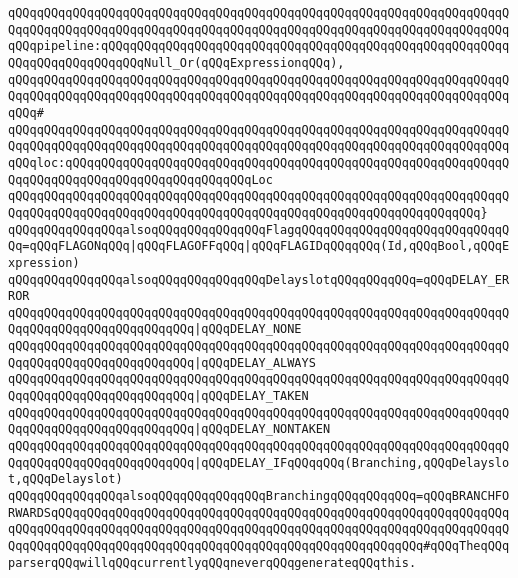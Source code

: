 \verb|qQQqqQQqqQQqqQQqqQQqqQQqqQQqqQQqqQQqqQQqqQQqqQQqqQQqqQQqqQQqqQQqqQQqqQQqqQQqqQQqqQQqqQQqqQQqqQQqqQQqqQQqqQQqqQQqqQQqqQQqqQQqqQQqqQQqqQQqqQQqqQQqpipeline:qQQqqQQqqQQqqQQqqQQqqQQqqQQqqQQqqQQqqQQqqQQqqQQqqQQqqQQqqQQqqQQqqQQqqQQqqQQqNull_Or(qQQqExpressionqQQq),|\newline
\verb|qQQqqQQqqQQqqQQqqQQqqQQqqQQqqQQqqQQqqQQqqQQqqQQqqQQqqQQqqQQqqQQqqQQqqQQqqQQqqQQqqQQqqQQqqQQqqQQqqQQqqQQqqQQqqQQqqQQqqQQqqQQqqQQqqQQqqQQqqQQqqQQq#|\newline
\verb|qQQqqQQqqQQqqQQqqQQqqQQqqQQqqQQqqQQqqQQqqQQqqQQqqQQqqQQqqQQqqQQqqQQqqQQqqQQqqQQqqQQqqQQqqQQqqQQqqQQqqQQqqQQqqQQqqQQqqQQqqQQqqQQqqQQqqQQqqQQqqQQqloc:qQQqqQQqqQQqqQQqqQQqqQQqqQQqqQQqqQQqqQQqqQQqqQQqqQQqqQQqqQQqqQQqqQQqqQQqqQQqqQQqqQQqqQQqqQQqqQQqLoc|\newline
\verb|qQQqqQQqqQQqqQQqqQQqqQQqqQQqqQQqqQQqqQQqqQQqqQQqqQQqqQQqqQQqqQQqqQQqqQQqqQQqqQQqqQQqqQQqqQQqqQQqqQQqqQQqqQQqqQQqqQQqqQQqqQQqqQQqqQQqqQQq}|\newline
\newline
\verb|qQQqqQQqqQQqqQQqalsoqQQqqQQqqQQqqQQqFlagqQQqqQQqqQQqqQQqqQQqqQQqqQQqqQQq=qQQqFLAGONqQQq|\verb#|qQQqFLAGOFFqQQq|qQQqFLAGIDqQQqqQQq(Id,qQQqBool,qQQqExpression)#\newline
\newline
\verb|qQQqqQQqqQQqqQQqalsoqQQqqQQqqQQqqQQqDelayslotqQQqqQQqqQQq=qQQqDELAY_ERROR|\newline
\verb|qQQqqQQqqQQqqQQqqQQqqQQqqQQqqQQqqQQqqQQqqQQqqQQqqQQqqQQqqQQqqQQqqQQqqQQqqQQqqQQqqQQqqQQqqQQqqQQq|\verb#|qQQqDELAY_NONE#\newline
\verb|qQQqqQQqqQQqqQQqqQQqqQQqqQQqqQQqqQQqqQQqqQQqqQQqqQQqqQQqqQQqqQQqqQQqqQQqqQQqqQQqqQQqqQQqqQQqqQQq|\verb#|qQQqDELAY_ALWAYS#\newline
\verb|qQQqqQQqqQQqqQQqqQQqqQQqqQQqqQQqqQQqqQQqqQQqqQQqqQQqqQQqqQQqqQQqqQQqqQQqqQQqqQQqqQQqqQQqqQQqqQQq|\verb#|qQQqDELAY_TAKEN#\newline
\verb|qQQqqQQqqQQqqQQqqQQqqQQqqQQqqQQqqQQqqQQqqQQqqQQqqQQqqQQqqQQqqQQqqQQqqQQqqQQqqQQqqQQqqQQqqQQqqQQq|\verb#|qQQqDELAY_NONTAKEN#\newline
\verb|qQQqqQQqqQQqqQQqqQQqqQQqqQQqqQQqqQQqqQQqqQQqqQQqqQQqqQQqqQQqqQQqqQQqqQQqqQQqqQQqqQQqqQQqqQQqqQQq|\verb#|qQQqDELAY_IFqQQqqQQq(Branching,qQQqDelayslot,qQQqDelayslot)#\newline
\newline
\verb|qQQqqQQqqQQqqQQqalsoqQQqqQQqqQQqqQQqBranchingqQQqqQQqqQQq=qQQqBRANCHFORWARDSqQQqqQQqqQQqqQQqqQQqqQQqqQQqqQQqqQQqqQQqqQQqqQQqqQQqqQQqqQQqqQQqqQQqqQQqqQQqqQQqqQQqqQQqqQQqqQQqqQQqqQQqqQQqqQQqqQQqqQQqqQQqqQQqqQQqqQQqqQQqqQQqqQQqqQQqqQQqqQQqqQQqqQQqqQQqqQQqqQQqqQQqqQQqqQQq#qQQqTheqQQqparserqQQqwillqQQqcurrentlyqQQqneverqQQqgenerateqQQqthis.|\newline
